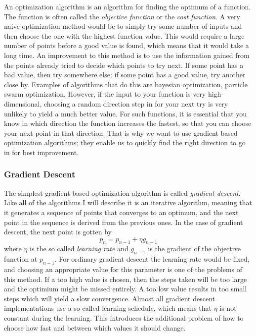 An optimization algorithm is an algorithm for finding the optimum of a function.
The function is often called the \emph{objective function} or the \emph{cost
function}.
A very naive optimization method would be to simply try some number of inputs
and then choose the one with the highest function value.
This would require a large number of points before a good value is found,
which means that it would take a long time.
An improvement to this method is to use the information gained from the points
already tried to decide which points to try next.
If some point has a bad value, then try somewhere else; if some point has a good
value, try another close by.
Examples of algorithms that do this are bayesian optimization, particle swarm
optimization, 
However, if the input to your function is very high-dimensional,
choosing a random direction step in for your next try is very unlikely
to yield a much better value.
For such functions, it is essential that you know in which direction the
function increases the fastest, so that you can choose your next point in that
direction. That is why we want to use gradient based optimization algorithms;
they enable us to quickly find the right direction to go in for best
improvement.


\subsubsection{Gradient Descent}

The simplest gradient based optimization algorithm is called \emph{gradient
descent}.
Like all of the algorithms I will describe it is an iterative algorithm,
meaning that it generates a sequence of points that converges to an optimum,
and the next point in the sequence is derived from the previous ones.
In the case of gradient descent, the next point is gotten by
\begin{equation}
	p_n = p_{n-1} + \eta g_{n-1}
\end{equation}
where $\eta$ is the so called \emph{learning rate} and $g_{n-1}$ is the gradient
of the objective function at $p_{n-1}$.
For ordinary gradient descent the learning rate would be fixed,
and choosing an appropriate value for this parameter is one of the problems of
this method.
If a too high value is chosen, then the steps taken will be too large and the
optimium might be missed entirely.
A too low value results in too small steps which will yield a slow convergence.
Almost all gradient descent implementations use a so called learning schedule,
which means that $\eta$ is not constant during the learning.
This introduces the additional problem of how to choose how fast and between
which values it should change.

